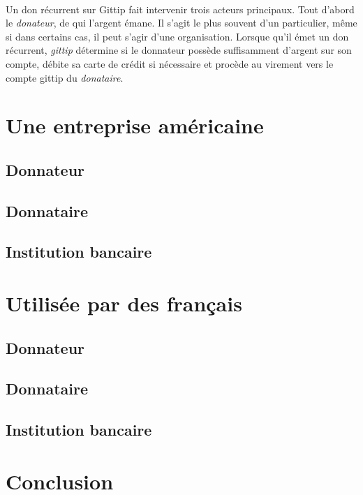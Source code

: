             \paragraph{}
                Un don récurrent sur Gittip fait intervenir trois acteurs
                principaux.
                Tout d'abord le \emph{donateur}, de qui l'argent émane.
                Il s'agit le plus souvent d'un particulier, même si dans
                certains cas, il peut s'agir d'une organisation.
                Lorsque qu'il émet un don récurrent, \emph{gittip} détermine si 
                le donnateur possède suffisamment d'argent sur son compte,
                débite sa carte de crédit si nécessaire et procède au
                virement vers le compte gittip du \emph{donataire}.
    \section{Une entreprise américaine}
        \subsection{Donnateur}
        \subsection{Donnataire}
        \subsection{Institution bancaire}
    \section{Utilisée par des français}
        \subsection{Donnateur}
        \subsection{Donnataire}
        \subsection{Institution bancaire}
    \section{Conclusion}
